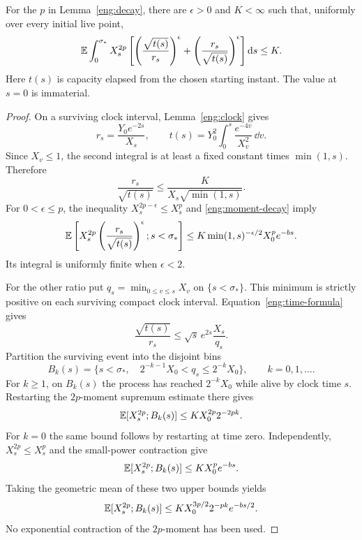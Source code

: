 \begin{lemma}\label{eng:weighted}
For the $p$ in Lemma~\ref{eng:decay}, there are $\epsilon>0$ and
$K<\infty$ such that, uniformly over every initial live point,
\begin{equation}\label{eng:weighted-clock}
 \mathbb E\int_0^{\sigma_*}X_s^{2p}
 \left[
   \left(\frac{\sqrt{t(s)}}{r_s}\right)^\epsilon
  +\left(\frac{r_s}{\sqrt{t(s)}}\right)^\epsilon
 \right]\mathrm d s\le K.
\end{equation}
Here $t(s)$ is capacity elapsed from the chosen starting instant.  The
value at $s=0$ is immaterial.
\end{lemma}

\begin{proof}
On a surviving clock interval, Lemma~\ref{eng:clock} gives
\begin{equation}\label{eng:time-formula}
 r_s=\frac{Y_0e^{-2s}}{X_s},\qquad
 t(s)=Y_0^2\int_0^s\frac{e^{-4v}}{X_v^2}\,\dd v.
\end{equation}
Since $X_v\le1$, the second integral is at least a fixed constant times
$\min(1,s)$.  Therefore
\begin{equation}\label{eng:inverse-ratio}
 \frac{r_s}{\sqrt{t(s)}}
 \le\frac{K}{X_s\sqrt{\min(1,s)}}.
\end{equation}
For $0<\epsilon\le p$, the inequality $X_s^{2p-\epsilon}\le X_s^p$
and \eqref{eng:moment-decay} imply
\begin{equation}\label{eng:inverse-ratio-mean}
 \mathbb E\left[X_s^{2p}
       \left(\frac{r_s}{\sqrt{t(s)}}\right)^\epsilon;
          s<\sigma_*\right]
 \le K\min(1,s)^{-\epsilon/2}X_0^p e^{-bs}.
\end{equation}
Its integral is uniformly finite when $\epsilon<2$.

For the other ratio put
$q_s=\min_{0\le v\le s}X_v$ on $\{s<\sigma_*\}$.  This minimum is
strictly positive on each surviving compact clock interval.
Equation~\eqref{eng:time-formula} gives
\begin{equation}\label{eng:forward-ratio}
 \frac{\sqrt{t(s)}}{r_s}
 \le\sqrt{s}\,e^{2s}\frac{X_s}{q_s}.
\end{equation}
Partition the surviving event into the disjoint bins
\[
 B_k(s)=\{s<\sigma_*,\quad
          2^{-k-1}X_0<q_s\le2^{-k}X_0\},\qquad k=0,1,\ldots.
\]
For $k\ge1$, on $B_k(s)$ the process has reached $2^{-k}X_0$ while
alive by clock time $s$.  Restarting the $2p$-moment supremum estimate
there gives
\begin{equation}\label{eng:bin-hit}
 \mathbb E[X_s^{2p};B_k(s)]\le K X_0^{2p}2^{-2pk}.
\end{equation}
For $k=0$ the same bound follows by restarting at time zero.  Independently,
$X_s^{2p}\le X_s^p$ and the small-power contraction give
\begin{equation}\label{eng:bin-decay}
 \mathbb E[X_s^{2p};B_k(s)]\le K X_0^p e^{-bs}.
\end{equation}
Taking the geometric mean of these two upper bounds yields
\begin{equation}\label{eng:bin-interpolation}
 \mathbb E[X_s^{2p};B_k(s)]
 \le K X_0^{3p/2}2^{-pk}e^{-bs/2}.
\end{equation}
No exponential contraction of the $2p$-moment has been used.


\end{proof}
